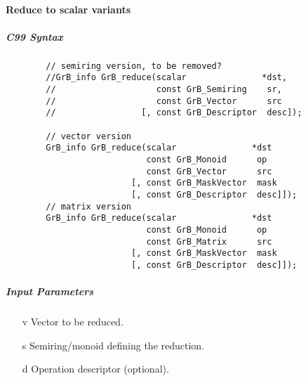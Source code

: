 \paragraph{Reduce to scalar variants}

\subparagraph{C99 Syntax}

\begin{verbatim}
        // semiring version, to be removed?
        //GrB_info GrB_reduce(scalar               *dst,
        //                    const GrB_Semiring    sr,
        //                    const GrB_Vector      src
        //                 [, const GrB_Descriptor  desc]);
                         
        // vector version
        GrB_info GrB_reduce(scalar               *dst
                            const GrB_Monoid      op
                            const GrB_Vector      src
                         [, const GrB_MaskVector  mask
                         [, const GrB_Descriptor  desc]]);
        // matrix version
        GrB_info GrB_reduce(scalar               *dst
                            const GrB_Monoid      op
                            const GrB_Matrix      src
                         [, const GrB_MaskVector  mask
                         [, const GrB_Descriptor  desc]]);
\end{verbatim}



\subparagraph{Input Parameters}

\begin{itemize}
    \item[{\sf v}] Vector to be reduced.
    \item[{\sf s}] Semiring/monoid defining the reduction.
    \item[{\sf d}] Operation descriptor (optional).
\end{itemize}


